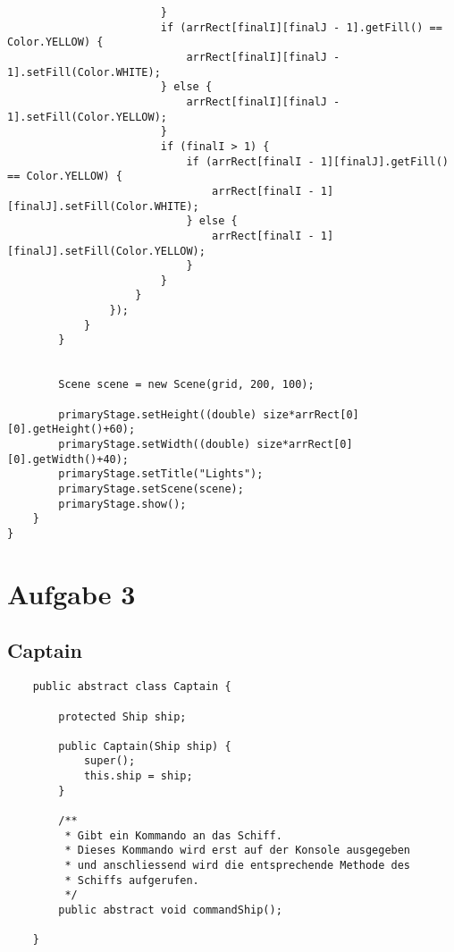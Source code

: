 \documentclass[12pt,a4paper,oneside,ngerman]{article}
\begin{document}
\begin{lstlisting}
                        }
                        if (arrRect[finalI][finalJ - 1].getFill() == Color.YELLOW) {
                            arrRect[finalI][finalJ - 1].setFill(Color.WHITE);
                        } else {
                            arrRect[finalI][finalJ - 1].setFill(Color.YELLOW);
                        }
                        if (finalI > 1) {
                            if (arrRect[finalI - 1][finalJ].getFill() == Color.YELLOW) {
                                arrRect[finalI - 1][finalJ].setFill(Color.WHITE);
                            } else {
                                arrRect[finalI - 1][finalJ].setFill(Color.YELLOW);
                            }
                        }
                    }
                });
            }
        }


        Scene scene = new Scene(grid, 200, 100);

        primaryStage.setHeight((double) size*arrRect[0][0].getHeight()+60);
        primaryStage.setWidth((double) size*arrRect[0][0].getWidth()+40);
        primaryStage.setTitle("Lights");
        primaryStage.setScene(scene);
        primaryStage.show();
    }
}

\end{lstlisting}
\section*{Aufgabe 3}
\subsection*{Captain}
\begin{lstlisting}
	public abstract class Captain {
	
		protected Ship ship;
		
		public Captain(Ship ship) {
			super();
			this.ship = ship;
		}
	
		/**
		 * Gibt ein Kommando an das Schiff.
		 * Dieses Kommando wird erst auf der Konsole ausgegeben
		 * und anschliessend wird die entsprechende Methode des
		 * Schiffs aufgerufen.
		 */
		public abstract void commandShip();
	
	}
	
\end{lstlisting}
\\ 
\end{document}
